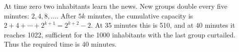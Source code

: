 At time zero two inhabitants learn the news. New groups double every five minutes: $2,4,8,\ldots$. After $5k$ minutes, the cumulative capacity is $2+4+\cdots+2^{k+1}=2^{k+2}-2$. At 35 minutes this is 510, and at 40 minutes it reaches 1022, sufficient for the 1000 inhabitants with the last group curtailed. Thus the required time is $\boxed{40\text{ minutes}}$.
